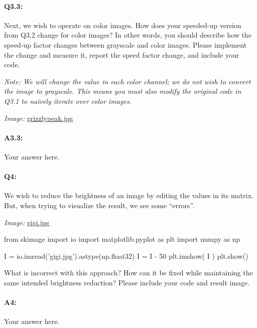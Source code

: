 \documentclass[11pt]{article}
\begin{document}
\pagebreak
\paragraph{Q3.3:} Next, we wish to operate on color images. How does your speeded-up version from Q3.2 change for color images? In other words, you should describe how the speed-up factor changes between grayscale and color images. Please implement the change and measure it, report the speed factor change, and include your code.

\emph{Note: We will change the value in each color channel; we do not wish to convert the image to grayscale. This means you must also modify the original code in Q3.1 to naively iterate over color images.}

\emph{Image:} \href{grizzlypeak.jpg}{grizzlypeak.jpg}

\paragraph{A3.3:} Your answer here.




\pagebreak
\paragraph{Q4:} We wish to reduce the brightness of an image by editing the values in its matrix. But, when trying to visualize the result, we see some ``errors''.

\emph{Image:} \href{gigi.jpg}{gigi.jpg}

\begin{python}
from skimage import io
import matplotlib.pyplot as plt
import numpy as np

I =  io.imread('gigi.jpg').astype(np.float32)
I = I - 50
plt.imshow( I )
plt.show()
\end{python}

What is incorrect with this approach? How can it be fixed while maintaining the same intended brightness reduction? Please include your code and result image.

\paragraph{A4:} Your answer here.



\end{document}
